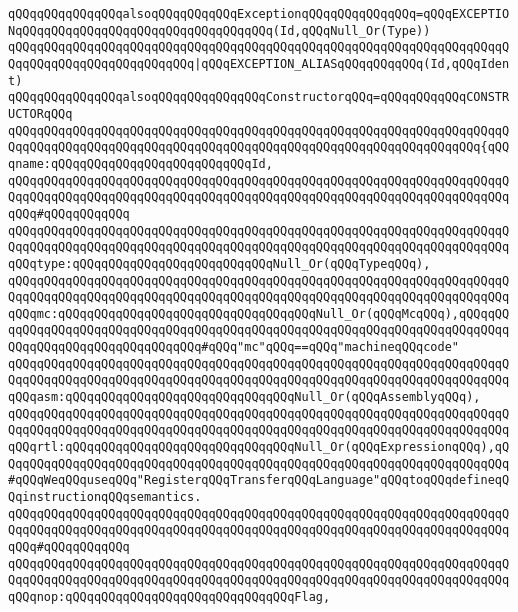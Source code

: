 \verb|qQQqqQQqqQQqqQQqalsoqQQqqQQqqQQqExceptionqQQqqQQqqQQqqQQq=qQQqEXCEPTIONqQQqqQQqqQQqqQQqqQQqqQQqqQQqqQQqqQQq(Id,qQQqNull_Or(Type))|\newline
\verb|qQQqqQQqqQQqqQQqqQQqqQQqqQQqqQQqqQQqqQQqqQQqqQQqqQQqqQQqqQQqqQQqqQQqqQQqqQQqqQQqqQQqqQQqqQQqqQQq|\verb#|qQQqEXCEPTION_ALIASqQQqqQQqqQQq(Id,qQQqIdent)#\newline
\newline
\verb|qQQqqQQqqQQqqQQqalsoqQQqqQQqqQQqqQQqConstructorqQQq=qQQqqQQqqQQqCONSTRUCTORqQQq|\newline
\verb|qQQqqQQqqQQqqQQqqQQqqQQqqQQqqQQqqQQqqQQqqQQqqQQqqQQqqQQqqQQqqQQqqQQqqQQqqQQqqQQqqQQqqQQqqQQqqQQqqQQqqQQqqQQqqQQqqQQqqQQqqQQqqQQqqQQqqQQq{qQQqname:qQQqqQQqqQQqqQQqqQQqqQQqqQQqId,|\newline
\verb|qQQqqQQqqQQqqQQqqQQqqQQqqQQqqQQqqQQqqQQqqQQqqQQqqQQqqQQqqQQqqQQqqQQqqQQqqQQqqQQqqQQqqQQqqQQqqQQqqQQqqQQqqQQqqQQqqQQqqQQqqQQqqQQqqQQqqQQqqQQqqQQq#qQQqqQQqqQQq|\newline
\verb|qQQqqQQqqQQqqQQqqQQqqQQqqQQqqQQqqQQqqQQqqQQqqQQqqQQqqQQqqQQqqQQqqQQqqQQqqQQqqQQqqQQqqQQqqQQqqQQqqQQqqQQqqQQqqQQqqQQqqQQqqQQqqQQqqQQqqQQqqQQqqQQqtype:qQQqqQQqqQQqqQQqqQQqqQQqqQQqNull_Or(qQQqTypeqQQq),|\newline
\verb|qQQqqQQqqQQqqQQqqQQqqQQqqQQqqQQqqQQqqQQqqQQqqQQqqQQqqQQqqQQqqQQqqQQqqQQqqQQqqQQqqQQqqQQqqQQqqQQqqQQqqQQqqQQqqQQqqQQqqQQqqQQqqQQqqQQqqQQqqQQqqQQqmc:qQQqqQQqqQQqqQQqqQQqqQQqqQQqqQQqqQQqNull_Or(qQQqMcqQQq),qQQqqQQqqQQqqQQqqQQqqQQqqQQqqQQqqQQqqQQqqQQqqQQqqQQqqQQqqQQqqQQqqQQqqQQqqQQqqQQqqQQqqQQqqQQqqQQqqQQqqQQq#qQQq"mc"qQQq==qQQq"machineqQQqcode"|\newline
\verb|qQQqqQQqqQQqqQQqqQQqqQQqqQQqqQQqqQQqqQQqqQQqqQQqqQQqqQQqqQQqqQQqqQQqqQQqqQQqqQQqqQQqqQQqqQQqqQQqqQQqqQQqqQQqqQQqqQQqqQQqqQQqqQQqqQQqqQQqqQQqqQQqasm:qQQqqQQqqQQqqQQqqQQqqQQqqQQqqQQqNull_Or(qQQqAssemblyqQQq),|\newline
\verb|qQQqqQQqqQQqqQQqqQQqqQQqqQQqqQQqqQQqqQQqqQQqqQQqqQQqqQQqqQQqqQQqqQQqqQQqqQQqqQQqqQQqqQQqqQQqqQQqqQQqqQQqqQQqqQQqqQQqqQQqqQQqqQQqqQQqqQQqqQQqqQQqrtl:qQQqqQQqqQQqqQQqqQQqqQQqqQQqqQQqNull_Or(qQQqExpressionqQQq),qQQqqQQqqQQqqQQqqQQqqQQqqQQqqQQqqQQqqQQqqQQqqQQqqQQqqQQqqQQqqQQqqQQqqQQq#qQQqWeqQQquseqQQq"RegisterqQQqTransferqQQqLanguage"qQQqtoqQQqdefineqQQqinstructionqQQqsemantics.|\newline
\verb|qQQqqQQqqQQqqQQqqQQqqQQqqQQqqQQqqQQqqQQqqQQqqQQqqQQqqQQqqQQqqQQqqQQqqQQqqQQqqQQqqQQqqQQqqQQqqQQqqQQqqQQqqQQqqQQqqQQqqQQqqQQqqQQqqQQqqQQqqQQqqQQq#qQQqqQQqqQQq|\newline
\verb|qQQqqQQqqQQqqQQqqQQqqQQqqQQqqQQqqQQqqQQqqQQqqQQqqQQqqQQqqQQqqQQqqQQqqQQqqQQqqQQqqQQqqQQqqQQqqQQqqQQqqQQqqQQqqQQqqQQqqQQqqQQqqQQqqQQqqQQqqQQqqQQqnop:qQQqqQQqqQQqqQQqqQQqqQQqqQQqqQQqFlag,|\newline
